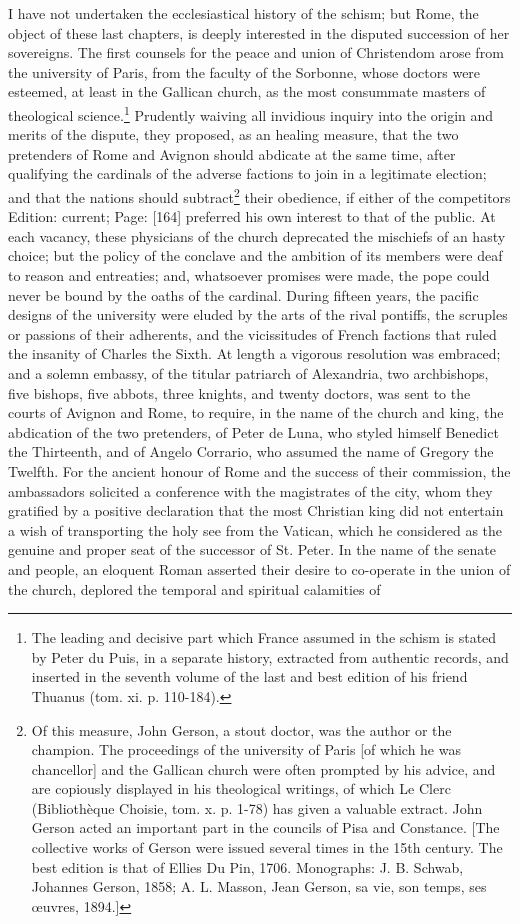 I have not undertaken the ecclesiastical history of the schism; but Rome, the object of these last chapters, is deeply interested in the disputed succession of her sovereigns. The first counsels for the peace and union of Christendom arose from the university of Paris, from the faculty of the Sorbonne, whose doctors were esteemed, at least in the Gallican church, as the most consummate masters of theological science.\footnote{The leading and decisive part which France assumed in the schism is stated by Peter du Puis, in a separate history, extracted from authentic records, and inserted in the seventh volume of the last and best edition of his friend Thuanus (tom. xi. p. 110-184).} Prudently waiving all invidious inquiry into the origin and merits of the dispute, they proposed, as an healing measure, that the two pretenders of Rome and Avignon should abdicate at the same time, after qualifying the cardinals of the adverse factions to join in a legitimate election; and that the nations should subtract\footnote{Of this measure, John Gerson, a stout doctor, was the author or the champion. The proceedings of the university of Paris [of which he was chancellor] and the Gallican church were often prompted by his advice, and are copiously displayed in his theological writings, of which Le Clerc (Bibliothèque Choisie, tom. x. p. 1-78) has given a valuable extract. John Gerson acted an important part in the councils of Pisa and Constance. [The collective works of Gerson were issued several times in the 15th century. The best edition is that of Ellies Du Pin, 1706. Monographs: J. B. Schwab, Johannes Gerson, 1858; A. L. Masson, Jean Gerson, sa vie, son temps, ses œuvres, 1894.]} their obedience, if either of the competitors Edition: current; Page: [164] preferred his own interest to that of the public. At each vacancy, these physicians of the church deprecated the mischiefs of an hasty choice; but the policy of the conclave and the ambition of its members were deaf to reason and entreaties; and, whatsoever promises were made, the pope could never be bound by the oaths of the cardinal. During fifteen years, the pacific designs of the university were eluded by the arts of the rival pontiffs, the scruples or passions of their adherents, and the vicissitudes of French factions that ruled the insanity of Charles the Sixth. At length a vigorous resolution was embraced; and a solemn embassy, of the titular patriarch of Alexandria, two archbishops, five bishops, five abbots, three knights, and twenty doctors, was sent to the courts of Avignon and Rome, to require, in the name of the church and king, the abdication of the two pretenders, of Peter de Luna, who styled himself Benedict the Thirteenth, and of Angelo Corrario, who assumed the name of Gregory the Twelfth. For the ancient honour of Rome and the success of their commission, the ambassadors solicited a conference with the magistrates of the city, whom they gratified by a positive declaration that the most Christian king did not entertain a wish of transporting the holy see from the Vatican, which he considered as the genuine and proper seat of the successor of St. Peter. In the name of the senate and people, an eloquent Roman asserted their desire to co-operate in the union of the church, deplored the temporal and spiritual calamities of 